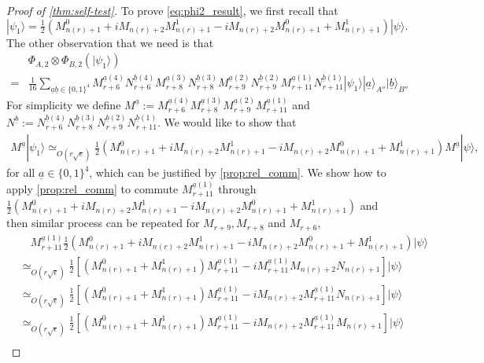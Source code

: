 \documentclass[11pt,letterpaper]{article}
\newcommand{\ket}[1]{|#1\rangle}
\newcommand{\x}{\otimes}
\newcommand{\1}{\mathbb{1}}
\newcommand{\nr}{n(r)}
\newcommand{\ua}{\underline{a}}
\newcommand{\ub}{\underline{b}}
\newcommand{\se}{\sqrt{\epsilon}}
\newcommand{\appd}[1]{\simeq_{#1}}
\theoremstyle{definition}
\begin{document}
\begin{proof}[Proof of \cref{thm:self-test}]
To prove \cref{eq:phi2_result}, we first
recall that 
$\ket{\psi_1} 
	=\frac{1}{2} (M_{\nr+1}^0 + iM_{\nr+2}M_{\nr+1}^1 - iM_{\nr+2}M_{\nr+1}^0 + M_{\nr+1}^1) \ket{\psi}.
$
The other observation that we need is that 
\begin{align*}
	&\Phi_{A,2} \x \Phi_{B,2} (\ket{\psi_1})  \\
	= &\frac{1}{16} \sum_{\ua \ub \in\{0,1\}^4}
	M_{r+6}^{\ua(4)}N_{r+6}^{\ub(4)}M_{r+8}^{\ua(3)}N_{r+8}^{\ub(3)}M_{r+9}^{\ua(2)}N_{r+9}^{\ub(2)}M_{r+11}^{\ua(1)}N_{r+11}^{\ub(1)}
	\ket{\psi_1} \ket{\ua}_{A''} \ket{\ub}_{B''}
\end{align*}
For simplicity we define $M^{\ua} := M_{r+6}^{\ua(4)}M_{r+8}^{\ua(3)}M_{r+9}^{\ua(2)}M_{r+11}^{\ua(1)}$ and
$N^{\ub} := N_{r+6}^{\ub(4)}N_{r+8}^{\ub(3)}N_{r+9}^{\ub(2)}N_{r+11}^{\ub(1)} $.
We would like to show that 
\begin{align}
\label{eq:mua_comm}
M^{\ua} \ket{\psi_1} \appd{O(r\se)} \frac{1}{2} (M_{\nr+1}^0 + iM_{\nr+2}M_{\nr+1}^1 - iM_{\nr+2}M_{\nr+1}^0 + M_{\nr+1}^1)
M^{\ua} \ket{\psi},
\end{align}
for all $\ua \in \{0,1\}^4$,
which can be justified by \cref{prop:rel_comm}.
We show how to apply \cref{prop:rel_comm} to commute $M_{r+11}^{\ua(1)}$ through 
$\frac{1}{2} (M_{\nr+1}^0 + iM_{\nr+2}M_{\nr+1}^1 - iM_{\nr+2}M_{\nr+1}^0 + M_{\nr+1}^1)$ and then similar process can be repeated for $M_{r+9}, M_{r+8}$ and $M_{r+6}$,
\begin{align*}
	&\quad M_{r+11}^{\ua(1)} \frac{1}{2} (M_{\nr+1}^0 + iM_{\nr+2}M_{\nr+1}^1 - iM_{\nr+2}M_{\nr+1}^0 + M_{\nr+1}^1) \ket{\psi} \\
	&\appd{O(r\se)} \frac{1}{2}[ (M_{\nr+1}^0+M_{\nr+1}^1) M_{r+11}^{\ua(1)} -i M_{r+11}^{\ua(1)} M_{\nr+2}N_{\nr+1}] \ket{\psi} \\
	&\appd{O(r\se)} \frac{1}{2} [(M_{\nr+1}^0+M_{\nr+1}^1) M_{r+11}^{\ua(1)} - iM_{\nr+2}M_{r+11}^{\ua(1)} N_{\nr+1}] \ket{\psi} \\
	&\appd{O(r\se)}\frac{1}{2} [(M_{\nr+1}^0+M_{\nr+1}^1) M_{r+11}^{\ua(1)} - iM_{\nr+2}M_{r+11}^{\ua(1)} M_{\nr+1}] \ket{\psi} \\

\end{align*}
\end{proof}
\end{document}
